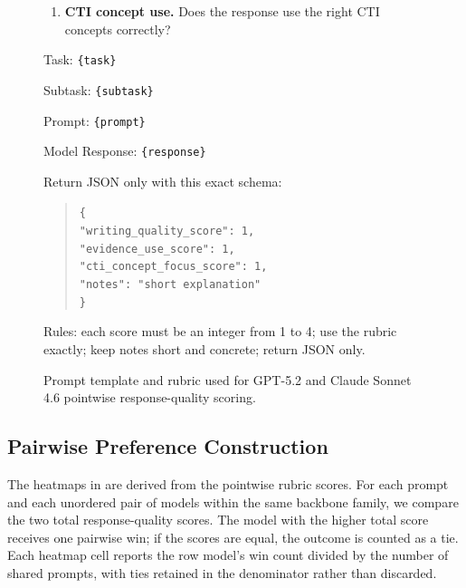 \begin{figure}[t]
\begin{tcolorbox}[title=Pointwise Response-Quality Judge Prompt]
\begin{enumerate}
  \item \textbf{CTI concept use.} Does the response use the right CTI concepts correctly?
\end{enumerate}

Task: \texttt{\{task\}}

Subtask: \texttt{\{subtask\}}

Prompt: \texttt{\{prompt\}}

Model Response: \texttt{\{response\}}

Return JSON only with this exact schema:
\begin{quote}
\small
\texttt{\{}\\
\texttt{"writing\_quality\_score": 1,}\\
\texttt{"evidence\_use\_score": 1,}\\
\texttt{"cti\_concept\_focus\_score": 1,}\\
\texttt{"notes": "short explanation"}\\
\texttt{\}}
\end{quote}

Rules: each score must be an integer from 1 to 4; use the rubric exactly; keep notes short and concrete; return JSON only.
\end{tcolorbox}
\caption{Prompt template and rubric used for GPT-5.2 and Claude Sonnet 4.6 pointwise response-quality scoring.}
\label{fig:pointwise-judge-prompt}
\end{figure}

\subsection{Pairwise Preference Construction}
\label{app:deriving-pairwise-preferences}

The heatmaps in  are derived from the pointwise rubric scores. For each prompt and each unordered pair of models within the same backbone family, we compare the two total response-quality scores. The model with the higher total score receives one pairwise win; if the scores are equal, the outcome is counted as a tie. Each heatmap cell reports the row model's win count divided by the number of shared prompts, with ties retained in the denominator rather than discarded.

